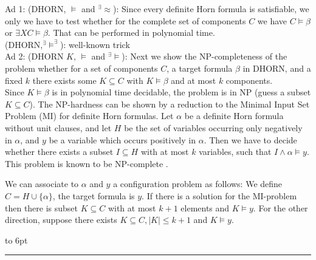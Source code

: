 \documentclass[12pt]{article}
\newcommand{\AM}{\mbox{$^\exists\!\!\models$}}
\newcommand{\AMB}{\mbox{$^\exists\!\!\models^\exists$}}
\newcommand{\AEQ}{\mbox{$^\exists\!\!\approx$}}
\newenvironment{proof}{\parindent=0pt{\bf Proof: }}{
   \hspace*{\fill}\hbox to 6pt{\leaders\hrule width 6pt height 6pt\hfill}\par}
\begin{document}
\begin{proof}
Ad 1: (DHORN, $\models$ and \AEQ): Since every definite Horn formula is satisfiable, we only we have to test whether for the complete set of components $C$ we have $C \models \beta$ or $\exists X C \models \beta$. That can be performed in polynomial time.\\

(DHORN,\AMB): well-known trick\\

Ad 2: (DHORN $K$, $\models$ and \AM): Next we show the NP-completeness of the problem whether for a set of components $C$, a target formula $\beta$ in DHORN, and a fixed $k$ there exists some $K \subseteq C$ with $K \models \beta$ and at most $k$ components.\\
Since $K \models \beta$ is in polynomial time decidable, the problem is in NP (guess a subset $K \subseteq C$).
The NP-hardness can be shown by a reduction to the Minimal Input Set Problem (MI) for definite Horn formulas.
Let $\alpha$ be a definite Horn formula without unit clauses, and let $H$ be the set of variables occurring only
negatively in $\alpha$, and $y$ be a variable which occurs positively in $\alpha$. Then we have to decide whether
there exists a subset $I \subseteq H$ with at most $k$ variables, such that $I \wedge \alpha \models y$. This problem is known to be NP-complete \cite{mi}.

We can associate to $\alpha$ and $y$ a configuration problem as follows: We define $C = H \cup \{\alpha\}$, the target
formula is $y$. If there is a solution for the MI-problem then there is subset $K \subseteq C$ with at most $k+1$ elements
and $K \models y$. For the other direction, suppose there exists $K \subseteq C, |K | \leq k+1$ and $K \models y$.
\end{proof}
\end{document}
